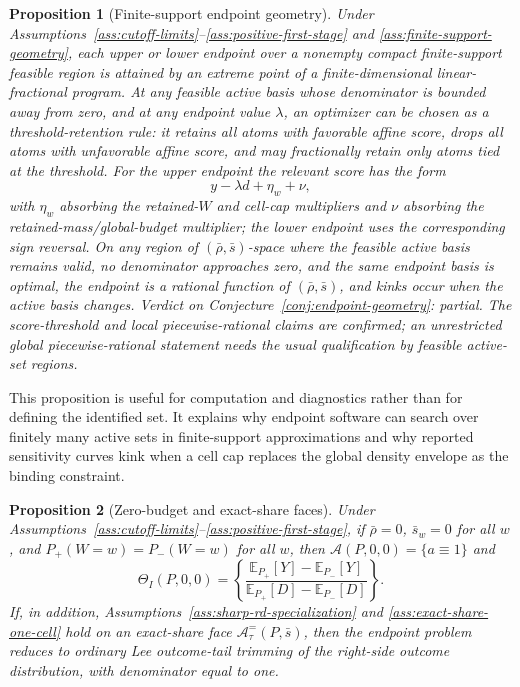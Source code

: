 \documentclass[11pt]{article}
\newcommand{\E}{\mathbb{E}}
\theoremstyle{definition}
\theoremstyle{plain}
\newtheorem{proposition}{Proposition}
\theoremstyle{remark}
\begin{document}
\begin{proposition}[Finite-support endpoint geometry]\label{prop:endpoint-geometry}
Under Assumptions~\ref{ass:cutoff-limits}--\ref{ass:positive-first-stage} and
\ref{ass:finite-support-geometry}, each upper or lower endpoint over a nonempty compact
finite-support feasible region is attained by an extreme point of a finite-dimensional
linear-fractional program.  At any feasible active basis whose denominator is bounded away
from zero, and at any endpoint value \(\lambda\), an optimizer can be chosen as a
threshold-retention rule: it retains all atoms with favorable affine score, drops all atoms
with unfavorable affine score, and may fractionally retain only atoms tied at the
threshold.  For the upper endpoint the relevant score has the form
\[
  y-\lambda d+\eta_w+\nu,
\]
with \(\eta_w\) absorbing the retained-\(W\) and cell-cap multipliers and \(\nu\)
absorbing the retained-mass/global-budget multiplier; the lower endpoint uses the
corresponding sign reversal.  On any region of \((\bar\rho,\bar s)\)-space where the
feasible active basis remains valid, no denominator approaches zero, and the same endpoint
basis is optimal, the endpoint is a rational function of
\((\bar\rho,\bar s)\), and kinks occur when the active basis changes.  Verdict on
Conjecture~\ref{conj:endpoint-geometry}: partial.  The score-threshold and local
piecewise-rational claims are confirmed; an unrestricted global piecewise-rational
statement needs the usual qualification by feasible active-set regions.
\end{proposition}

This proposition is useful for computation and diagnostics rather than for defining the
identified set.  It explains why endpoint software can search over finitely many active
sets in finite-support approximations and why reported sensitivity curves kink when a
cell cap replaces the global density envelope as the binding constraint.

\begin{proposition}[Zero-budget and exact-share faces]\label{prop:faces}
Under Assumptions~\ref{ass:cutoff-limits}--\ref{ass:positive-first-stage}, if
\(\bar\rho=0\), \(\bar s_w=0\) for all \(w\), and \(P_+(W=w)=P_-(W=w)\) for all \(w\),
then \(\mathcal A(P,0,0)=\{a\equiv1\}\) and
\[
  \Theta_I(P,0,0)=
  \left\{
  \frac{\E_{P_+}[Y]-\E_{P_-}[Y]}{\E_{P_+}[D]-\E_{P_-}[D]}
  \right\}.
\]
If, in addition, Assumptions~\ref{ass:sharp-rd-specialization} and
\ref{ass:exact-share-one-cell} hold on an exact-share face
\(\mathcal A^{=}_\tau(P,\bar s)\), then the endpoint problem reduces to ordinary
Lee outcome-tail trimming of the right-side outcome distribution, with denominator equal
to one.
\end{proposition}
\end{document}
